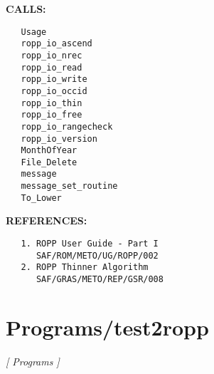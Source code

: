 \textbf{CALLS:}\hspace{0.08in}\begin{Verbatim}
   Usage
   ropp_io_ascend
   ropp_io_nrec
   ropp_io_read
   ropp_io_write
   ropp_io_occid
   ropp_io_thin
   ropp_io_free
   ropp_io_rangecheck
   ropp_io_version
   MonthOfYear
   File_Delete
   message
   message_set_routine
   To_Lower
\end{Verbatim}
\textbf{REFERENCES:}\hspace{0.08in}\begin{Verbatim}
   1. ROPP User Guide - Part I
      SAF/ROM/METO/UG/ROPP/002
   2. ROPP Thinner Algorithm
      SAF/GRAS/METO/REP/GSR/008
\end{Verbatim}
\section{Programs/test2ropp}
\textsl{[ Programs ]}


